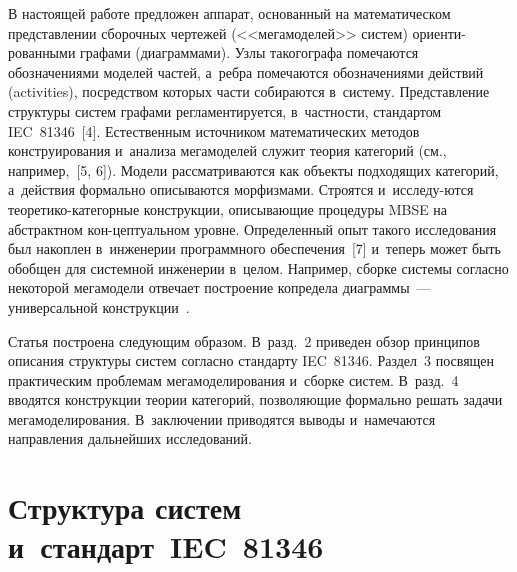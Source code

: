 \begin{multicols}{2}
   В настоящей работе предложен аппарат, основанный на математическом 
представлении сборочных чертежей (<<мегамоделей>> систем) 
ориенти-\linebreak рованными графами (диаграммами). Узлы такого\linebreak графа помечаются 
обозначениями моделей час\-тей, а~реб\-ра помечаются обозначениями действий\linebreak 
(activities), посредством которых части собираются в~систему. Представление 
структуры систем графами регламентируется, в~частности, стандартом 
IEC~81346~[4]. Естественным источником математических методов 
конструирования и~анализа мегамоделей служит теория категорий (см., 
например,~[5, 6]). Модели рассматриваются как объекты подходящих 
категорий, а~действия формально описываются морфизмами. Строятся 
и~исследу-\linebreak ются тео\-ре\-ти\-ко-ка\-те\-гор\-ные конструкции, опи\-сы\-ва\-ющие процедуры 
MBSE на абстрактном кон-\linebreak цептуальном уровне. Определенный опыт такого\linebreak 
исследования был накоплен в~инженерии программного обеспечения~[7] 
и~теперь может быть обобщен для системной инженерии в~целом. Например, 
сборке системы согласно некоторой мегамодели отвечает построение 
копредела диаграммы~--- универсальной конструкции~\cite{5-kov}.
   
   Статья построена следующим образом. В~разд.~2 приведен обзор 
принципов описания структуры сис\-тем согласно стандарту IEC~81346. 
Раздел~3 посвящен практическим проб\-ле\-мам мегамоделирования и~сборке 
сис\-тем. В~разд.~4 вводятся конструкции тео\-рии категорий, позволяющие 
формально решать задачи мегамоделирования. В~заключении приводятся 
выводы и~намечаются направления дальнейших исследований.

\section{Структура систем и~стандарт~IEC~81346}


\end{multicols}
